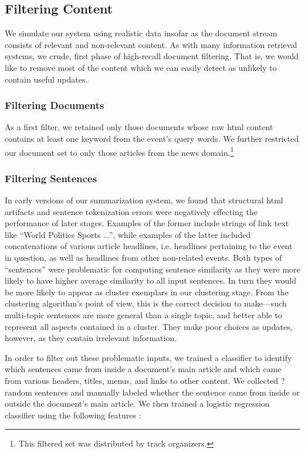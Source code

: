 \subsection{Filtering Content}
\label{sec:filtering}
We simulate our system using realistic data insofar as the document stream consists of relevant and non-relevant content.  As with many information retrieval systems, we crude, first phase of high-recall document filtering.  That is, we would like to remove most of the content which we can easily detect as unlikely to contain useful updates.  

\subsubsection{Filtering Documents}
\label{sec:filtering:documents}
As a first filter, we retained only those documents whose raw html content contains at least one keyword from the event's query words. We further restricted our document set to only those articles from the news domain.\footnote{This filtered set was distributed by track organizers.}  

\subsubsection{Filtering Sentences}
\label{sec:filtering:sentences}
In early versions of our summarization system, we found that structural html
artifacts and sentence tokenization errors
were negatively effecting the performance of later stages. Examples of the 
former include strings of link text like ``World Politics Sports ...'', while
examples of the latter included concatenations of various article headlines,
i.e. headlines pertaining to the event in question, as well as headlines from
other non-related events.
Both types of ``sentences'' were problematic for computing sentence similarity
as they were more likely to have higher average similarity to all input 
sentences. In turn they would be more likely to appear as cluster exemplars
in our clustering stage. From the clustering algorithm's point of view, this
is the correct decision to make---such multi-topic sentences are more general 
than a single topic, and better able to represent all aspects contained in a 
cluster. They make poor choices as updates, however, as they contain 
irrelevant information.

In order to filter out these problematic inputs, we trained a classifier to 
identify which sentences came from inside a document's main article and which
came from various headers, titles, menus, and links to other content. We collected ? random sentences and manually labeled whether the sentence came from
inside or outside the document's main article. We then trained a logistic 
regression classifier using the following features :

